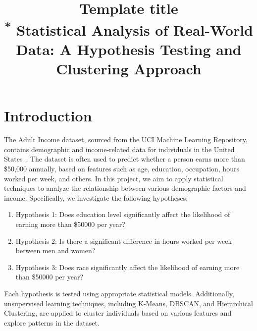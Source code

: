 \documentclass[conference]{IEEEtran}
\begin{document}
\title{Template title\\
{\footnotesize \textsuperscript{*} 
  Statistical Analysis of Real-World Data: A Hypothesis Testing and Clustering Approach}
}


\author{
}

\maketitle

\begin{abstract}
\end{abstract}

\begin{IEEEkeywords}
\end{IEEEkeywords}

\section{Introduction}
The Adult Income dataset, sourced from the UCI Machine Learning Repository, contains demographic and income-related data for individuals in the United States~\cite{adult_2}. 
The dataset is often used to predict whether a person earns more than \$50,000 annually, based on features such as age, education, occupation, hours worked per week, and others. 
In this project, we aim to apply statistical techniques to analyze the relationship between various demographic factors and income. Specifically, we investigate the following hypotheses:


\begin{enumerate}
  \item Hypothesis 1: Does education level significantly affect the likelihood of earning more than \$50000 per year?
  \item Hypothesis 2: Is there a significant difference in hours worked per week between men and women?
  \item Hypothesis 3: Does race significantly affect the likelihood of earning more than \$50000 per year?
\end{enumerate}

Each hypothesis is tested using appropriate statistical models. 
Additionally, unsupervised learning techniques, including K-Means, DBSCAN, and Hierarchical Clustering, are applied to cluster individuals based on various features and explore patterns in the dataset.
\end{document}
